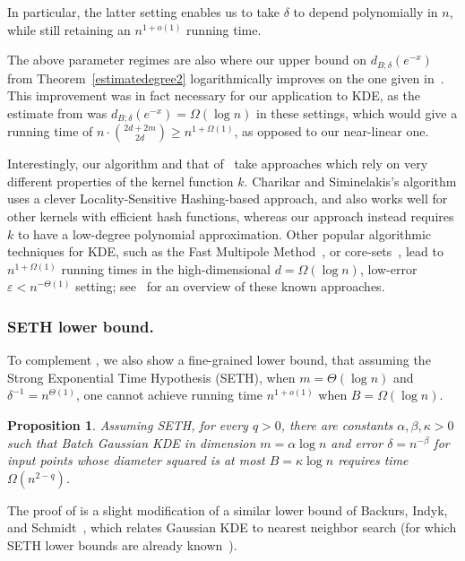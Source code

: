 \documentclass[10pt,a4paper]{article}
\newcommand{\eps}{\varepsilon}
\theoremstyle{plain}\newtheorem{theorem}{Theorem}
\newtheorem{proposition}[theorem]{Proposition}
\theoremstyle{definition}
\begin{document}
In particular, the latter setting enables us to take $\delta$ to depend polynomially in $n$, while still retaining an $n^{1+o(1)}$ running time.

The above parameter regimes are also where our upper bound on $d_{B; \delta} (e^{-x})$ from Theorem~\ref{estimatedegree2} logarithmically improves on the one given in~\cite{sachdeva2014faster}. This improvement was in fact necessary for our application to KDE, as the estimate from \cite{sachdeva2014faster} was $d_{B; \delta} (e^{-x}) = \Omega (\log n)$ in these settings, which would give a running time of $n \cdot \binom{2d+2m}{2d} \geq n^{1 + \Omega(1)}$, as opposed to our near-linear one.


Interestingly, our algorithm and that of~\cite{charikar2017hashing} take approaches which rely on very different properties of the kernel function $k$. Charikar and Siminelakis's algorithm uses a clever Locality-Sensitive Hashing-based approach, and also works well for other kernels with efficient hash functions, whereas our approach instead requires $k$ to have a low-degree polynomial approximation. Other popular algorithmic techniques for KDE, such as the Fast Multipole Method~\cite{greengard1987fast}, or core-sets~\cite{agarwal2005geometric,phillips2013varepsilon}, lead to $n^{1 + \Omega(1)}$ running times in the high-dimensional $d = \Omega(\log n)$, low-error $\eps < n^{-\Theta(1)}$ setting; see~\cite[Section~1.3.2]{syminelakis2019fast} for an overview of these known approaches.  \\

 \subsubsection{SETH lower bound.}\label{subsec:2} To complement , we also show a fine-grained lower bound, that assuming the Strong Exponential Time Hypothesis (SETH), when $m = \Theta(\log n)$ and $\delta^{-1} = n^{\Theta(1)}$, one cannot achieve running time $n^{1+o(1)}$ when $B = \Omega(\log n)$.

\begin{proposition} \label{sethlb}
Assuming SETH, for every $q>0$, there are constants $\alpha, \beta, \kappa > 0$ such that Batch Gaussian KDE in dimension $m = \alpha \log n$ and error $\delta = n^{-\beta}$ for input points whose diameter squared is at most $B = \kappa \log n$ requires time $\Omega(n^{2-q})$.
\end{proposition}

The proof of  is a slight modification of a similar lower bound of Backurs, Indyk, and Schmidt~\cite{backurs2017fine}, which relates Gaussian KDE to nearest neighbor search (for which SETH lower bounds are already known~\cite{rubinstein2018hardness}). 
\end{document}
